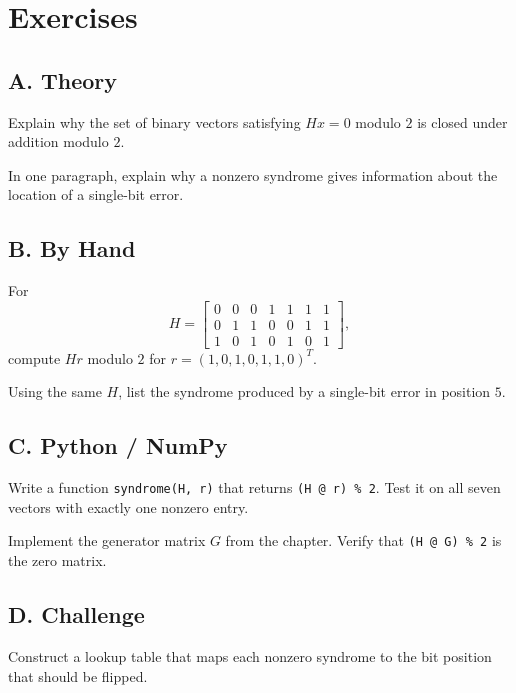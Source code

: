 \section*{Exercises}

\subsection*{A. Theory}

\begin{exercise}
Explain why the set of binary vectors satisfying $Hx=0$ modulo $2$ is closed
under addition modulo $2$.
\end{exercise}

\begin{exercise}
In one paragraph, explain why a nonzero syndrome gives information about the
location of a single-bit error.
\end{exercise}

\subsection*{B. By Hand}

\begin{exercise}
For
\[
H=\begin{bmatrix}
0&0&0&1&1&1&1\\
0&1&1&0&0&1&1\\
1&0&1&0&1&0&1
\end{bmatrix},
\]
compute $Hr$ modulo $2$ for $r=(1,0,1,0,1,1,0)^T$.
\end{exercise}

\begin{exercise}
Using the same $H$, list the syndrome produced by a single-bit error in
position $5$.
\end{exercise}

\subsection*{C. Python / NumPy}

\begin{exercise}
Write a function \texttt{syndrome(H, r)} that returns \texttt{(H @ r) \% 2}.
Test it on all seven vectors with exactly one nonzero entry.
\end{exercise}

\begin{exercise}
Implement the generator matrix $G$ from the chapter. Verify that
\texttt{(H @ G) \% 2} is the zero matrix.
\end{exercise}

\subsection*{D. Challenge}

\begin{exercise}
Construct a lookup table that maps each nonzero syndrome to the bit position
that should be flipped.
\end{exercise}
